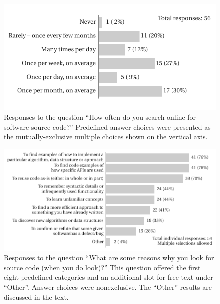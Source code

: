 \documentclass{casicswhitepaper}
\begin{document}
\begin{figure}[bht]
  \vspace*{-1ex}
  \centering
  \hspace*{15pt}\includegraphics{files/plots/bar-graph-how-often-src.pdf}
  \vspace*{-2.75ex}
  \caption{Responses to the question  ``How often do you search online for software source code?''  Predefined answer choices were presented as the mutually-exclusive multiple choices shown on the vertical axis.}
  \label{how-often-search-for-src}
\end{figure}

\begin{figure}[hb]
  \vspace*{-0.25ex}
  \centering
  \includegraphics{files/plots/bar-graph-why-search-for-src.pdf}
  \vspace*{-1.75ex}
  \caption{Responses to the question ``What are some reasons why you look for source code (when you do look)?''  This question offered the first eight predefined categories and an additional slot for free text under ``Other''.  Answer choices were nonexclusive.  The ``Other'' results are discussed in the text.}
  \label{why-search-for-src}
\end{figure}
\end{document}
